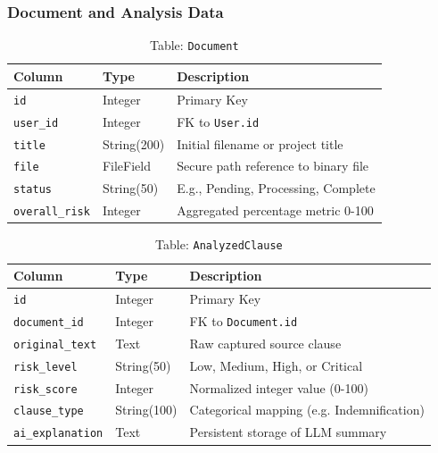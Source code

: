 \documentclass[a4paper,12pt]{report}
\begin{document}
\subsubsection*{Document and Analysis Data}

\begin{table}[H]
\centering
\caption{Table: \texttt{Document}}
\vspace{6pt}
\renewcommand{\arraystretch}{1.3}
\begin{tabular}{|l|l|p{7cm}|}
\hline
\textbf{Column} & \textbf{Type} & \textbf{Description} \\
\hline
\texttt{id}            & Integer     & Primary Key \\
\texttt{user\_id}      & Integer     & FK to \texttt{User.id} \\
\texttt{title}         & String(200) & Initial filename or project title \\
\texttt{file}          & FileField   & Secure path reference to binary file \\
\texttt{status}        & String(50)  & E.g., Pending, Processing, Complete \\
\texttt{overall\_risk} & Integer     & Aggregated percentage metric 0-100 \\
\hline
\end{tabular}
\label{tab:db_documents}
\end{table}

\begin{table}[H]
\centering
\caption{Table: \texttt{AnalyzedClause}}
\vspace{6pt}
\renewcommand{\arraystretch}{1.3}
\begin{tabular}{|l|l|p{7cm}|}
\hline
\textbf{Column} & \textbf{Type} & \textbf{Description} \\
\hline
\texttt{id}            & Integer     & Primary Key \\
\texttt{document\_id}  & Integer     & FK to \texttt{Document.id} \\
\texttt{original\_text}& Text        & Raw captured source clause \\
\texttt{risk\_level}   & String(50)  & Low, Medium, High, or Critical \\
\texttt{risk\_score}   & Integer     & Normalized integer value (0-100) \\
\texttt{clause\_type}  & String(100) & Categorical mapping (e.g. Indemnification) \\
\texttt{ai\_explanation}& Text       & Persistent storage of LLM summary \\
\hline
\end{tabular}
\label{tab:db_analyzedclause}
\end{table}
\end{document}
